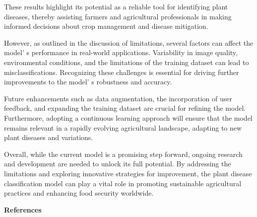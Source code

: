 \begin{multicols}{2}
These results highlight its potential as a reliable tool for identifying
plant diseases, thereby assisting farmers and agricultural professionals
in making informed decisions about crop management and disease
mitigation.

However, as outlined in the discussion of limitations, several factors
can affect the model' s performance in real-world
applications. Variability in image quality, environmental conditions,
and the limitations of the training dataset can lead to
misclassifications. Recognizing these challenges is essential for
driving further improvements to the model' s robustness
and accuracy.

Future enhancements such as data augmentation, the incorporation of user
feedback, and expanding the training dataset are crucial for refining
the model. Furthermore, adopting a continuous learning approach will
ensure that the model remains relevant in a rapidly evolving
agricultural landscape, adapting to new plant diseases and variations.

Overall, while the current model is a promising step forward, ongoing
research and development are needed to unlock its full potential. By
addressing the limitations and exploring innovative strategies for
improvement, the plant disease classification model can play a vital
role in promoting sustainable agricultural practices and enhancing food
security worldwide.
\end{multicols}

\begin{center}
{\bfseries References}
\end{center}

